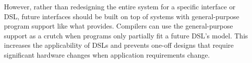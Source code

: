 However, rather than redesigning the entire system for a specific interface or DSL, future interfaces should be built on top of systems with general-purpose program support like what \riptide provides.
% 
Compilers can use the general-purpose support as a crutch when programs only partially fit a future DSL's model.
% 
This increases the applicability of DSLs and prevents one-off designs that require significant hardware changes when application requirements change.

